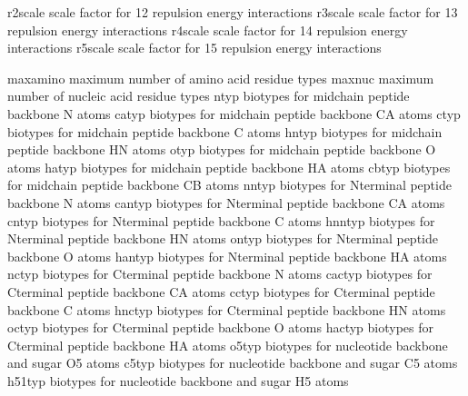 \documentclass[letterpaper,11pt,english]{sphinxmanual}
\begin{document}

\begin{sphinxVerbatim}[commandchars=\\\{\}]
r2scale         scale factor for 1\PYGZhy{}2 repulsion energy interactions
r3scale         scale factor for 1\PYGZhy{}3 repulsion energy interactions
r4scale         scale factor for 1\PYGZhy{}4 repulsion energy interactions
r5scale         scale factor for 1\PYGZhy{}5 repulsion energy interactions
\end{sphinxVerbatim}


\begin{sphinxVerbatim}[commandchars=\\\{\}]
maxamino        maximum number of amino acid residue types
maxnuc          maximum number of nucleic acid residue types
ntyp            biotypes for mid\PYGZhy{}chain peptide backbone N atoms
catyp           biotypes for mid\PYGZhy{}chain peptide backbone CA atoms
ctyp            biotypes for mid\PYGZhy{}chain peptide backbone C atoms
hntyp           biotypes for mid\PYGZhy{}chain peptide backbone HN atoms
otyp            biotypes for mid\PYGZhy{}chain peptide backbone O atoms
hatyp           biotypes for mid\PYGZhy{}chain peptide backbone HA atoms
cbtyp           biotypes for mid\PYGZhy{}chain peptide backbone CB atoms
nntyp           biotypes for N\PYGZhy{}terminal peptide backbone N atoms
cantyp          biotypes for N\PYGZhy{}terminal peptide backbone CA atoms
cntyp           biotypes for N\PYGZhy{}terminal peptide backbone C atoms
hnntyp          biotypes for N\PYGZhy{}terminal peptide backbone HN atoms
ontyp           biotypes for N\PYGZhy{}terminal peptide backbone O atoms
hantyp          biotypes for N\PYGZhy{}terminal peptide backbone HA atoms
nctyp           biotypes for C\PYGZhy{}terminal peptide backbone N atoms
cactyp          biotypes for C\PYGZhy{}terminal peptide backbone CA atoms
cctyp           biotypes for C\PYGZhy{}terminal peptide backbone C atoms
hnctyp          biotypes for C\PYGZhy{}terminal peptide backbone HN atoms
octyp           biotypes for C\PYGZhy{}terminal peptide backbone O atoms
hactyp          biotypes for C\PYGZhy{}terminal peptide backbone HA atoms
o5typ           biotypes for nucleotide backbone and sugar O5\PYGZsq{} atoms
c5typ           biotypes for nucleotide backbone and sugar C5\PYGZsq{} atoms
h51typ          biotypes for nucleotide backbone and sugar H5\PYGZsq{} atoms

\end{sphinxVerbatim}
\end{document}
